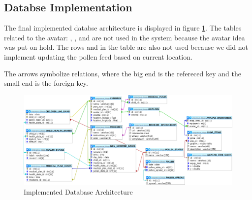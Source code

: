 \subsection{Databse Implementation}
\label{sec:databaseImplementaion}
The final implemented databse architecture is displayed in figure \ref{fig:databaseImplementation}. The tables related to
the avatar: , ,  and  are not used in the system because 
the avatar idea was put on hold. The rows  and  in the table  are also
not used because we did not implement updating the pollen feed based on current location.

The arrows symbolize relations, where the big end is the refereced key and the small end is the foreign key.

\begin{figure}
	\begin{center}
	\begin{sideways}
		\includegraphics[width=0.8\paperheight]{Pictures/ArchPictures/DatabaseImplementation}
	\end{sideways}
	\end{center}
	\caption{Implemented Database Architecture}
	\label{fig:databaseImplementation}
\end{figure}